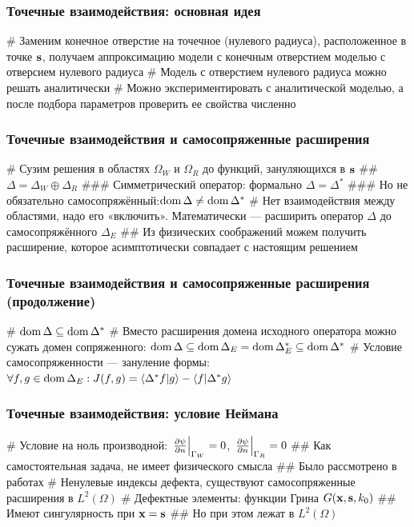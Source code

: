 \documentclass{beamer}
\begin{document}
\begin{frame}[fragile]
\frametitle{Точечные взаимодействия: основная идея}
\begin{easylist}[itemize]
# Заменим конечное отверстие на точечное (нулевого радиуса), расположенное в точке $\vb{s}$, получаем аппроксимацию модели с конечным отверстием моделью с отверсием нулевого радиуса
# Модель с отверстием нулевого радиуса можно решать аналитически
# Можно экспериментировать с аналитической моделью, а после подбора параметров проверить ее свойства численно
\end{easylist}
\end{frame}


\begin{frame}[fragile]
\frametitle{Точечные взаимодействия и самосопряженные расширения}
\begin{easylist}[itemize]
# Сузим решения в областях $\Omega_W$ и $\Omega_R$ до функций, зануляющихся в $\vb{s}$
## $\Delta = \Delta_W \oplus \Delta_R$
### Симметрический оператор: формально $\Delta = \Delta^*$
### Но не обязательно самосопряжённый:$\operatorname{dom}{\Delta} \ne \operatorname{dom}{\Delta^*}$
# Нет взаимодействия между областями, надо его «включить». Математически — расширить оператор $\Delta$ до самосопряжённого $\Delta_E$
## Из физических соображений можем получить расширение, которое асимптотически совпадает с настоящим решением
\end{easylist}
\end{frame}


\begin{frame}[fragile]
\frametitle{Точечные взаимодействия и самосопряженные расширения (продолжение)}
\begin{easylist}[itemize]
# $\operatorname{dom}{\Delta} \subseteq \operatorname{dom}{\Delta^*}$
# Вместо расширения домена исходного оператора можно сужать домен сопряженного: $\operatorname{dom}{\Delta} \subseteq \operatorname{dom}{\Delta_E} = \operatorname{dom}{\Delta_E^*} \subseteq \operatorname{dom}{\Delta^*}$
# Условие самосопряженности — зануление формы: $\forall f, g \in \dom{\Delta_E}: J(f, g) = \ip{\Delta^* f}{g} - \ip{f}{\Delta^* g}$ 
\end{easylist}
\end{frame}


\begin{frame}[fragile]
\frametitle{Точечные взаимодействия: условие Неймана}
\begin{easylist}[itemize]
# Условие на ноль производной: $\eval{\pdv{\psi}{n}}_{\Gamma_W} = 0$, $\eval{\pdv{\psi}{n}}_{\Gamma_R} = 0$
## Как самостоятельная задача, не имеет физического смысла
## Было рассмотрено в работах 
# Ненулевые индексы дефекта, существуют самосопряженные расширения в $L^2(\Omega)$
# Дефектные элементы: функции Грина $G(\vb{x}, \vb{s}, k_0)$
## Имеют сингулярность при $\vb{x} = \vb{s}$
## Но при этом лежат в $L^2(\Omega)$
\end{easylist}
\end{frame}
\end{document}
